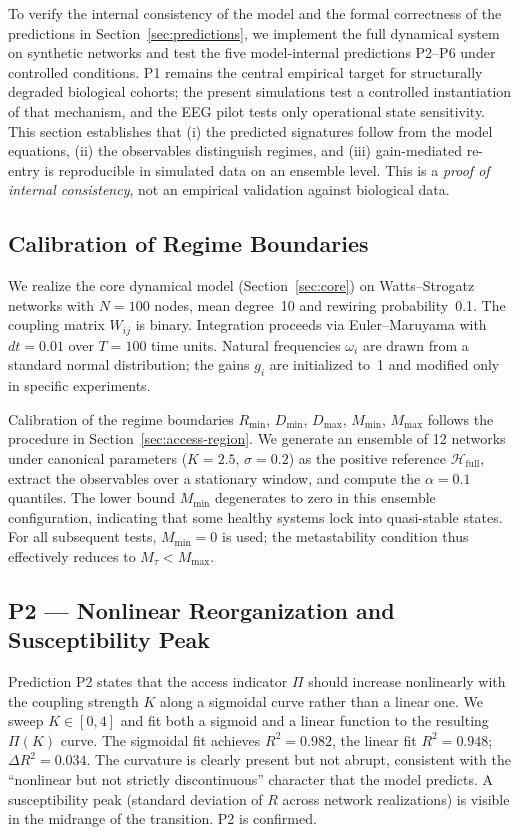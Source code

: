 \documentclass[11pt,a4paper]{article}
\theoremstyle{plain}
\theoremstyle{definition}
\theoremstyle{remark}
\begin{document}
To verify the internal consistency of the model and the formal correctness of the predictions in Section~\ref{sec:predictions}, we implement the full dynamical system on synthetic networks and test the five model-internal predictions P2--P6 under controlled conditions. P1 remains the central empirical target for structurally degraded biological cohorts; the present simulations test a controlled instantiation of that mechanism, and the EEG pilot tests only operational state sensitivity. This section establishes that (i) the predicted signatures follow from the model equations, (ii) the observables distinguish regimes, and (iii) gain-mediated re-entry is reproducible in simulated data on an ensemble level. This is a \emph{proof of internal consistency}, not an empirical validation against biological data.

\subsection{Calibration of Regime Boundaries}

We realize the core dynamical model (Section~\ref{sec:core}) on Watts--Strogatz networks with $N = 100$ nodes, mean degree~10 and rewiring probability~0.1. The coupling matrix $W_{ij}$ is binary. Integration proceeds via Euler--Maruyama with $dt = 0.01$ over $T = 100$ time units. Natural frequencies $\omega_i$ are drawn from a standard normal distribution; the gains $g_i$ are initialized to~1 and modified only in specific experiments.

Calibration of the regime boundaries $R_{\min}$, $D_{\min}$, $D_{\max}$, $M_{\min}$, $M_{\max}$ follows the procedure in Section~\ref{sec:access-region}. We generate an ensemble of 12 networks under canonical parameters ($K = 2.5$, $\sigma = 0.2$) as the positive reference $\mathcal{H}_{\mathrm{full}}$, extract the observables over a stationary window, and compute the $\alpha = 0.1$ quantiles. The lower bound $M_{\min}$ degenerates to zero in this ensemble configuration, indicating that some healthy systems lock into quasi-stable states. For all subsequent tests, $M_{\min} = 0$ is used; the metastability condition thus effectively reduces to $M_\tau < M_{\max}$.

\subsection{P2 --- Nonlinear Reorganization and Susceptibility Peak}

Prediction P2 states that the access indicator $\Pi$ should increase nonlinearly with the coupling strength $K$ along a sigmoidal curve rather than a linear one. We sweep $K \in [0, 4]$ and fit both a sigmoid and a linear function to the resulting $\Pi(K)$ curve. The sigmoidal fit achieves $R^2 = 0.982$, the linear fit $R^2 = 0.948$; $\Delta R^2 = 0.034$. The curvature is clearly present but not abrupt, consistent with the ``nonlinear but not strictly discontinuous'' character that the model predicts. A susceptibility peak (standard deviation of $R$ across network realizations) is visible in the midrange of the transition. P2 is confirmed.
\end{document}
